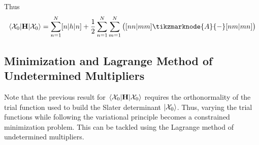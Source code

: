 \documentclass[12pt,a4paper,titlepage]{article}
\newcommand{\Chi}{\mathcal{X}} %
\begin{document}
\newpage
Thus
\begin{equation}
\mel{\Chi_{0}}{\vb{H}}{\Chi_{0}}=\sum_{n=1}^{N}[n|h|n]+\frac{1}{2}\sum_{n=1}^{N}\sum_{m=1}^{N}\big([nn|mm]\tikzmarknode{A}{-}[nm|mn]\big)
\end{equation}
\subsection{Minimization and Lagrange Method of Undetermined Multipliers}
Note that the previous result for $\mel{\Chi_{0}}{\vb{H}}{\Chi_{0}}$ requires the orthonormality of the trial function used to build the Slater determinant $\ket{\Chi_{0}}$. Thus, varying the trial functions while following the variational principle becomes a constrained minimization problem. This can be tackled using the Lagrange method of undetermined multipliers.\\
\end{document}
